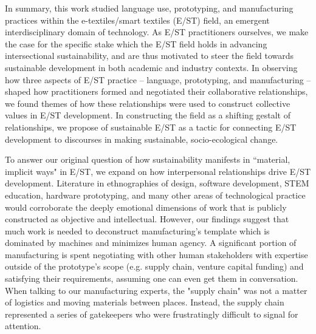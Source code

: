 \documentclass[manuscript,review,anonymous]{acmart}
\begin{document}
In summary, this work studied language use, prototyping, and manufacturing practices within the e-textiles/smart textiles (E/ST) field, an emergent interdisciplinary domain of technology. As E/ST practitioners ourselves, we make the case for the specific stake which the E/ST field holds in advancing intersectional sustainability, and are thus motivated to steer the field towards sustainable development in both academic and industry contexts. In observing how three aspects of E/ST practice -- language, prototyping, and manufacturing -- shaped how practitioners formed and negotiated their collaborative relationships, we 
found themes of how these relationships were used to construct collective values in E/ST development. In constructing the field as a shifting gestalt of relationships, we propose  of sustainable E/ST as a tactic for connecting E/ST development to discourses in making sustainable, socio-ecological change.

To answer our original question of how sustainability manifests in ``material, implicit ways" in E/ST, we expand on how interpersonal relationships drive E/ST development. Literature in ethnographies of design, software development, STEM education, hardware prototyping, and many other areas of technological practice would corroborate the deeply emotional dimensions of work that is publicly constructed as objective and intellectual. However, our findings suggest that much work is needed to deconstruct manufacturing's template which is dominated by machines and minimizes human agency. 
A significant portion of manufacturing is spent negotiating with other human stakeholders with expertise outside of the prototype's scope (e.g. supply chain, venture capital funding) and satisfying their requirements, assuming one can even get them in conversation. When talking to our manufacturing experts, the "supply chain" was not a matter of logistics and moving materials between places. Instead, the supply chain represented a series of gatekeepers who were frustratingly difficult to signal for attention. 
\end{document}
